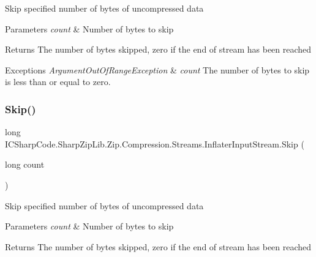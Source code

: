 Skip specified number of bytes of uncompressed data 


\begin{DoxyParams}{Parameters}
{\em count} & Number of bytes to skip \\
\hline
\end{DoxyParams}
\begin{DoxyReturn}{Returns}
The number of bytes skipped, zero if the end of stream has been reached 
\end{DoxyReturn}

\begin{DoxyExceptions}{Exceptions}
{\em Argument\+Out\+Of\+Range\+Exception} & {\itshape count} The number of bytes to skip is less than or equal to zero. \\
\hline
\end{DoxyExceptions}
\mbox{\label{class_i_c_sharp_code_1_1_sharp_zip_lib_1_1_zip_1_1_compression_1_1_streams_1_1_inflater_input_stream_ac10ceeea77e8db40068875b66ca86f42}} 
\subsubsection{\texorpdfstring{Skip()}{Skip()}\hspace{0.1cm}{\footnotesize\ttfamily [2/2]}}
{\footnotesize\ttfamily long I\+C\+Sharp\+Code.\+Sharp\+Zip\+Lib.\+Zip.\+Compression.\+Streams.\+Inflater\+Input\+Stream.\+Skip (\begin{DoxyParamCaption}\item[{long}]{count }\end{DoxyParamCaption})\hspace{0.3cm}{\ttfamily [inline]}}



Skip specified number of bytes of uncompressed data 


\begin{DoxyParams}{Parameters}
{\em count} & Number of bytes to skip \\
\hline
\end{DoxyParams}
\begin{DoxyReturn}{Returns}
The number of bytes skipped, zero if the end of stream has been reached 
\end{DoxyReturn}

